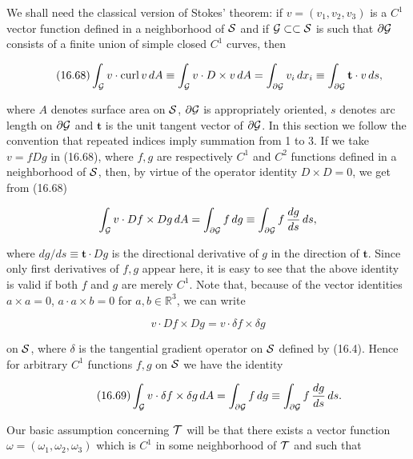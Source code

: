 We shall need the classical version of Stokes' theorem: if $v=(v_1,v_2,v_3)$ is a $C^1$
vector function defined in a neighborhood of $\mathcal{S}$ and if $\mathcal{G}\subset\subset\mathcal{S}$ is such that $\partial\mathcal{G}$
consists of a finite union of simple closed $C^1$ curves, then

\begin{equation}\tag{16.68}
\int_{\mathcal{G}} v\cdot \mathrm{curl}\, v\, dA \equiv \int_{\mathcal{G}} v\cdot D\times v\, dA
= \int_{\partial\mathcal{G}} v_i\,dx_i \equiv \int_{\partial\mathcal{G}} \mathbf{t}\cdot v\, ds,
\end{equation}

where $A$ denotes surface area on $\mathcal{S}$, $\partial\mathcal{G}$ is appropriately oriented, $s$ denotes arc
length on $\partial\mathcal{G}$ and $\mathbf{t}$ is the unit tangent vector of $\partial\mathcal{G}$. In this section we follow the
convention that repeated indices imply summation from 1 to 3. If we take $v=fDg$
in (16.68), where $f,g$ are respectively $C^1$ and $C^2$ functions defined in a neighborhood
of $\mathcal{S}$, then, by virtue of the operator identity $D\times D=0$, we get from (16.68)

\begin{equation}
\int_{\mathcal{G}} v\cdot Df\times Dg\, dA = \int_{\partial\mathcal{G}} f\,dg \equiv \int_{\partial\mathcal{G}} f\,\frac{dg}{ds}\, ds,
\end{equation}

where $dg/ds\equiv \mathbf{t}\cdot Dg$ is the directional derivative of $g$ in the direction of $\mathbf{t}$. Since only
first derivatives of $f,g$ appear here, it is easy to see that the above identity is valid
if both $f$ and $g$ are merely $C^1$. Note that, because of the vector identities $a\times a=0$,
$a\cdot a\times b=0$ for $a,b\in\mathbb{R}^3$, we can write

\[
v\cdot Df\times Dg = v\cdot \delta f\times \delta g
\]

on $\mathcal{S}$, where $\delta$ is the tangential gradient operator on $\mathcal{S}$ defined by (16.4). Hence
for arbitrary $C^1$ functions $f,g$ on $\mathcal{S}$ we have the identity

\begin{equation}\tag{16.69}
\int_{\mathcal{G}} v\cdot \delta f\times \delta g\, dA = \int_{\partial\mathcal{G}} f\,dg \equiv \int_{\partial\mathcal{G}} f\,\frac{dg}{ds}\, ds.
\end{equation}



Our basic assumption concerning $\mathcal{T}$ will be that there exists a vector function
$\omega=(\omega_1,\omega_2,\omega_3)$ which is $C^1$ in some neighborhood of $\mathcal{T}$ and such that

